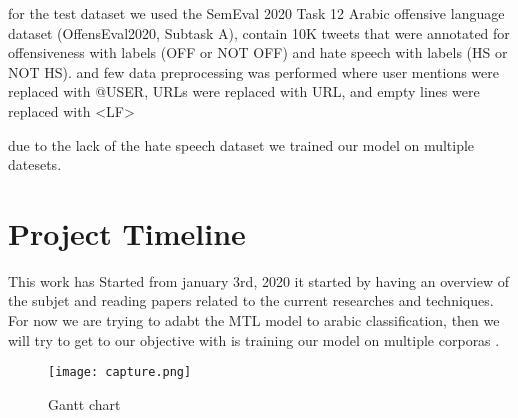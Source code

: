\documentclass[paper=a4, fontsize=11pt]{scrartcl}
\numberwithin{equation}{section}		%
\numberwithin{figure}{section}			%
\numberwithin{table}{section}				%
\begin{document}
for the test dataset we used the SemEval 2020 Task 12 Arabic offensive language dataset (OffensEval2020, Subtask A), contain 10K tweets that were annotated for offensiveness with labels (OFF or NOT OFF) and hate speech with labels (HS or NOT HS). and few data preprocessing was performed where user mentions were replaced with @USER, URLs were replaced with URL, and empty lines were replaced with <LF>

due to the lack of the hate speech dataset we trained our model on multiple datesets. 

\pagebreak
\section{Project Timeline}

This work has Started from january 3rd, 2020 it started by having an overview of the subjet and reading papers related to the current researches and techniques. For now we are trying to adabt the MTL model to arabic classification, then we will try to get to our objective with is training our model on multiple corporas . \\
\begin{figure}
    \centering
    \texttt{[image: capture.png]}
    \caption{Gantt chart}
    \label{fig:my_label}
\end{figure}

\pagebreak



\end{document}
